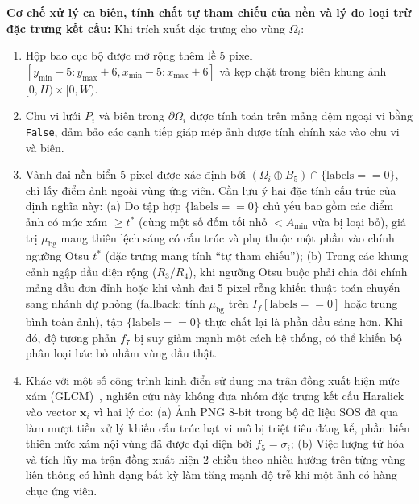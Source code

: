 \noindent\textbf{Cơ chế xử lý ca biên, tính chất tự tham chiếu của nền và lý do loại trừ đặc trưng kết cấu:}
Khi trích xuất đặc trưng cho vùng $\Omega_i$:
\begin{enumerate}
    \item Hộp bao cục bộ được mở rộng thêm lề 5 pixel $[y_{\min}-5 : y_{\max}+6, x_{\min}-5 : x_{\max}+6]$ và kẹp chặt trong biên khung ảnh $[0, H) \times [0, W)$.
    \item Chu vi lưới $P_i$ và biên trong $\partial \Omega_i$ được tính toán trên mảng đệm ngoại vi bằng \texttt{False}, đảm bảo các cạnh tiếp giáp mép ảnh được tính chính xác vào chu vi và biên.
    \item Vành đai nền biển 5 pixel được xác định bởi $(\Omega_i \oplus B_5) \cap \{ \text{labels} == 0 \}$, chỉ lấy điểm ảnh ngoài vùng ứng viên. Cần lưu ý hai đặc tính cấu trúc của định nghĩa này: (a) Do tập hợp $\{\text{labels} == 0\}$ chủ yếu bao gồm các điểm ảnh có mức xám $\ge t^*$ (cùng một số đốm tối nhỏ $< A_{\min}$ vừa bị loại bỏ), giá trị $\mu_{\text{bg}}$ mang thiên lệch sáng có cấu trúc và phụ thuộc một phần vào chính ngưỡng Otsu $t^*$ (đặc trưng mang tính ``tự tham chiếu''); (b) Trong các khung cảnh ngập dầu diện rộng ($R_3/R_4$), khi ngưỡng Otsu buộc phải chia đôi chính mảng dầu đơn đỉnh hoặc khi vành đai 5 pixel rỗng khiến thuật toán chuyển sang nhánh dự phòng (fallback: tính $\mu_{\text{bg}}$ trên $I_f[\text{labels} == 0]$ hoặc trung bình toàn ảnh), tập $\{\text{labels} == 0\}$ thực chất lại là phần dầu sáng hơn. Khi đó, độ tương phản $f_7$ bị suy giảm mạnh một cách hệ thống, có thể khiến bộ phân loại bác bỏ nhầm vùng dầu thật.
    \item Khác với một số công trình kinh điển sử dụng ma trận đồng xuất hiện mức xám (GLCM)~\cite{brekke2005oil,singha2013oil}, nghiên cứu này không đưa nhóm đặc trưng kết cấu Haralick vào vector $\mathbf{x}_i$ vì hai lý do: (a) Ảnh PNG 8-bit trong bộ dữ liệu SOS đã qua làm mượt tiền xử lý khiến cấu trúc hạt vi mô bị triệt tiêu đáng kể, phần biến thiên mức xám nội vùng đã được đại diện bởi $f_5 = \sigma_i$; (b) Việc lượng tử hóa và tích lũy ma trận đồng xuất hiện 2 chiều theo nhiều hướng trên từng vùng liên thông có hình dạng bất kỳ làm tăng mạnh độ trễ khi một ảnh có hàng chục ứng viên.
\end{enumerate}


